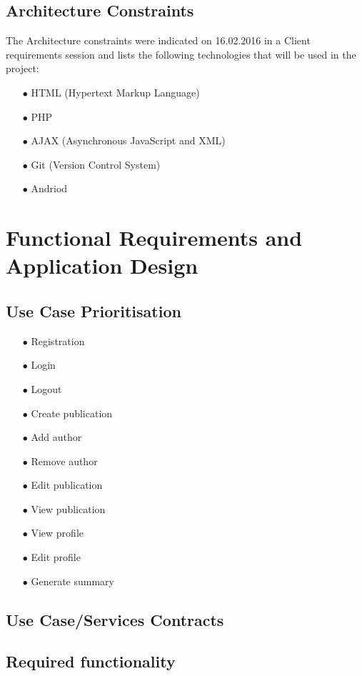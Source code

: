 \documentclass[a4paper,12pt]{article}
\begin{document}
\subsection{Architecture Constraints}
The Architecture constraints were indicated on 16.02.2016 in a Client requirements session and lists the following technologies that will be used in the project:
\begin{itemize}
	\item[$\bullet$]HTML (Hypertext Markup Language) 
	\item[$\bullet$]PHP
	\item[$\bullet$]AJAX (Asynchronous JavaScript and XML)
	\item[$\bullet$]Git (Version Control System)
	\item[$\bullet$]Andriod
	\\
\end{itemize}

\newpage
\section{Functional Requirements and Application Design}
\subsection{Use Case Prioritisation}
\begin{itemize}
	\item[$\bullet$]Registration
	\item[$\bullet$]Login
	\item[$\bullet$]Logout
	\item[$\bullet$]Create publication
	\item[$\bullet$]Add author
	\item[$\bullet$]Remove author
	\item[$\bullet$]Edit publication
	\item[$\bullet$]View publication
	\item[$\bullet$]View profile
	\item[$\bullet$]Edit profile
	\item[$\bullet$]Generate summary
	\\
\end{itemize}
\subsection{Use Case/Services Contracts}
\subsection{Required functionality}
\end{document}
